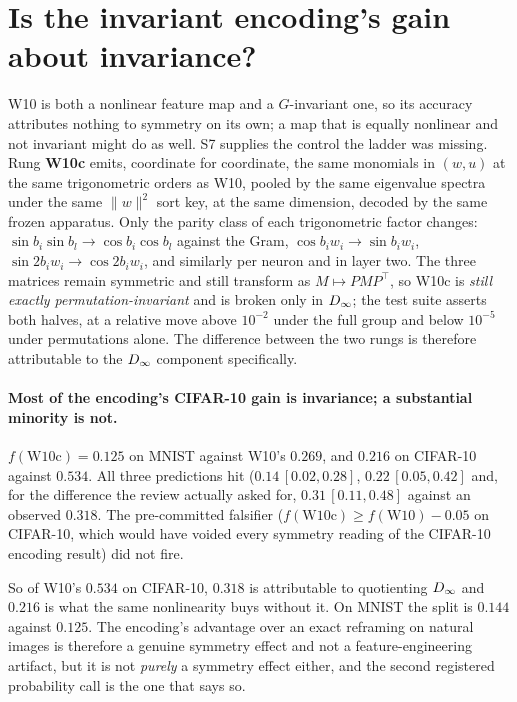 


\section{Is the invariant encoding's gain about invariance?}\label{app:control}\label{sec:control}

W10 is both a nonlinear feature map and a $G$-invariant one, so its accuracy attributes nothing to
symmetry on its own; a map that is equally nonlinear and not invariant might do as well. S7 supplies
the control the ladder was missing. Rung \textbf{W10c} emits, coordinate for coordinate, the same
monomials in $(w,u)$ at the same trigonometric orders as W10, pooled by the same eigenvalue spectra
under the same $\|w\|^2$ sort key, at the same dimension, decoded by the same frozen apparatus. Only
the parity class of each trigonometric factor changes: $\sin b_i \sin b_l \to \cos b_i \cos b_l$
against the Gram, $\cos b_i w_i \to \sin b_i w_i$, $\sin 2b_i w_i \to \cos 2b_i w_i$, and similarly
per neuron and in layer two. The three matrices remain symmetric and still transform as
$M \mapsto PMP^\top$, so W10c is \emph{still exactly permutation-invariant} and is broken only in
$D_\infty$; the test suite asserts both halves, at a relative move above $10^{-2}$ under the full group
and below $10^{-5}$ under permutations alone. The difference between the two rungs is therefore
attributable to the $D_\infty$ component specifically.



\paragraph{Most of the encoding's CIFAR-10 gain is invariance; a substantial minority is not.}
$f(\mathrm{W10c}) = 0.125$ on MNIST against W10's $0.269$, and $0.216$ on CIFAR-10 against
$0.534$. All three predictions hit ($0.14\,[0.02,0.28]$, $0.22\,[0.05,0.42]$ and, for
the difference the review actually asked for, $0.31\,[0.11,0.48]$ against an observed $0.318$. The
pre-committed falsifier ($f(\mathrm{W10c}) \ge f(\mathrm{W10}) - 0.05$ on CIFAR-10, which would
have voided every symmetry reading of the CIFAR-10 encoding result) did not fire.

So of W10's $0.534$ on CIFAR-10, $0.318$ is attributable to quotienting $D_\infty$ and $0.216$ is
what the same nonlinearity buys without it. On MNIST the split is $0.144$ against $0.125$. The
encoding's advantage over an exact reframing on natural images is therefore a genuine symmetry
effect and not a feature-engineering artifact, but it is not \emph{purely} a symmetry effect
either, and the second registered probability call is the one that says so.


